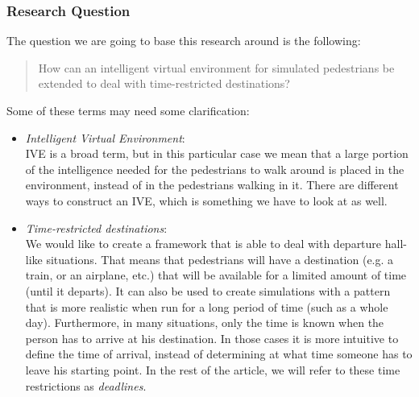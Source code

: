 \documentclass[11pt]{book}
\begin{document}
\subsubsection{Research Question}
The question we are going to base this research around is the following:
\begin{quote}
How can an intelligent virtual environment for simulated pedestrians be extended to deal with time-restricted destinations?
\end{quote}
Some of these terms may need some clarification:
\begin{itemize}
\item \emph{Intelligent Virtual Environment}:\\
IVE is a broad term, but in this particular case we mean that a large portion of the intelligence needed for the pedestrians to walk around is placed in the environment, instead of in the pedestrians walking in it. There are different ways to construct an IVE, which is something we have to look at as well.

\item \emph{Time-restricted destinations}:\\
We would like to create a framework that is able to deal with departure hall-like situations. That means that pedestrians will have a destination (e.g. a train, or an airplane, etc.) that will be available for a limited amount of time (until it departs). It can also be used to create simulations with a pattern that is more realistic when run for a long period of time (such as a whole day). Furthermore, in many situations, only the time is known when the person has to arrive at his destination. In those cases it is more intuitive to define the time of arrival, instead of determining at what time someone has to leave his starting point. In the rest of the article, we will refer to these time restrictions as \emph{deadlines}.
\end{itemize}
\end{document}
